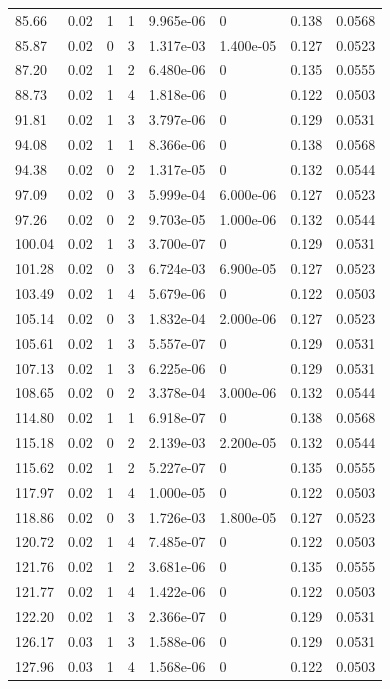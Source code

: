 \documentclass[preview]{standalone}
\begin{document}
{{{\begin{tabular}{L{1.2cm}C{1.2cm} C{0.3cm}C{0.5cm} C{1.4cm}C{1.4cm} C{1.4cm}C{1.4cm}}
  85.66  &  0.02  & 1     &  1 &  9.965e-06  & 0  & 0.138 &  0.0568   \\ 
  85.87  &  0.02  & 0     &  3 &  1.317e-03  & 1.400e-05  & 0.127 &  0.0523   \\ 
  87.20  &  0.02  & 1     &  2 &  6.480e-06  & 0  & 0.135 &  0.0555   \\ 
  88.73  &  0.02  & 1     &  4 &  1.818e-06  & 0  & 0.122 &  0.0503   \\ 
  91.81  &  0.02  & 1     &  3 &  3.797e-06  & 0  & 0.129 &  0.0531   \\ 
  94.08  &  0.02  & 1     &  1 &  8.366e-06  & 0  & 0.138 &  0.0568   \\ 
  94.38  &  0.02  & 0     &  2 &  1.317e-05  & 0  & 0.132 &  0.0544   \\ 
  97.09  &  0.02  & 0     &  3 &  5.999e-04  & 6.000e-06  & 0.127 &  0.0523   \\ 
  97.26  &  0.02  & 0     &  2 &  9.703e-05  & 1.000e-06  & 0.132 &  0.0544   \\ 
  100.04  &  0.02  & 1     &  3 &  3.700e-07  & 0  & 0.129 &  0.0531   \\ 
  101.28  &  0.02  & 0     &  3 &  6.724e-03  & 6.900e-05  & 0.127 &  0.0523   \\ 
  103.49  &  0.02  & 1     &  4 &  5.679e-06  & 0  & 0.122 &  0.0503   \\ 
  105.14  &  0.02  & 0     &  3 &  1.832e-04  & 2.000e-06  & 0.127 &  0.0523   \\ 
  105.61  &  0.02  & 1     &  3 &  5.557e-07  & 0  & 0.129 &  0.0531   \\ 
  107.13  &  0.02  & 1     &  3 &  6.225e-06  & 0  & 0.129 &  0.0531   \\ 
  108.65  &  0.02  & 0     &  2 &  3.378e-04  & 3.000e-06  & 0.132 &  0.0544   \\ 
  114.80  &  0.02  & 1     &  1 &  6.918e-07  & 0  & 0.138 &  0.0568   \\ 
  115.18  &  0.02  & 0     &  2 &  2.139e-03  & 2.200e-05  & 0.132 &  0.0544   \\ 
  115.62  &  0.02  & 1     &  2 &  5.227e-07  & 0  & 0.135 &  0.0555   \\ 
  117.97  &  0.02  & 1     &  4 &  1.000e-05  & 0  & 0.122 &  0.0503   \\ 
  118.86  &  0.02  & 0     &  3 &  1.726e-03  & 1.800e-05  & 0.127 &  0.0523   \\ 
  120.72  &  0.02  & 1     &  4 &  7.485e-07  & 0  & 0.122 &  0.0503   \\ 
  121.76  &  0.02  & 1     &  2 &  3.681e-06  & 0  & 0.135 &  0.0555   \\ 
  121.77  &  0.02  & 1     &  4 &  1.422e-06  & 0  & 0.122 &  0.0503   \\ 
  122.20  &  0.02  & 1     &  3 &  2.366e-07  & 0  & 0.129 &  0.0531   \\ 
  126.17  &  0.03  & 1     &  3 &  1.588e-06  & 0  & 0.129 &  0.0531   \\ 
  127.96  &  0.03  & 1     &  4 &  1.568e-06  & 0  & 0.122 &  0.0503   \\ 
\hline 
\end{tabular} 

}}}
\end{document}
